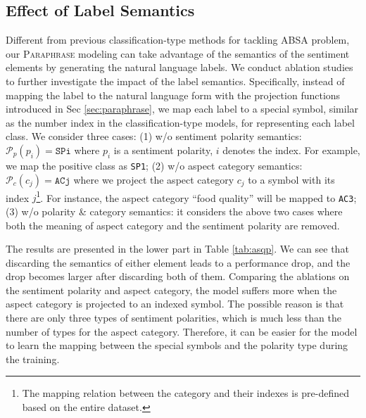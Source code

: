 \documentclass[11pt]{article}
\begin{document}
\subsection{Effect of Label Semantics}
Different from previous classification-type methods for tackling ABSA problem, our \textsc{Paraphrase} modeling can take advantage of the semantics of the sentiment elements by generating the natural language labels. We conduct ablation studies to further investigate the impact of the label semantics. 
Specifically, instead of mapping the label to the natural language form with the projection functions introduced in Sec \ref{sec:paraphrase}, we map each label to a special symbol, similar as the number index in the classification-type models, for representing each label class. 
We consider three cases: (1) w/o sentiment polarity semantics: $\mathcal{P}_p(p_i) =\texttt{SPi}$ where $p_i$ is a sentiment polarity, $i$ denotes the index. For example, we map the positive class as \verb|SP1|;
(2) w/o aspect category semantics: $\mathcal{P}_c(c_j)=\texttt{ACj}$ where we project the aspect category $c_j$ to a symbol with its index $j$\footnote{The mapping relation between the category and their indexes is pre-defined based on the entire dataset.}. For instance, the aspect category ``food quality'' will be mapped to \verb|AC3|;
(3) w/o polarity \& category semantics: it considers the above two cases where both the meaning of aspect category and the sentiment polarity are removed. 

The results are presented in the lower part in Table \ref{tab:asqp}. We can see that discarding the semantics of either element leads to a performance drop, and the drop becomes larger after discarding both of them.
Comparing the ablations on the sentiment polarity and aspect category, the model suffers more when the aspect category is projected to an indexed symbol. The possible reason is that there are only three types of sentiment polarities, which is much less than the number of types for the aspect category. Therefore, it can be easier for the model to learn the mapping between the special symbols and the polarity type during the training.
\end{document}
